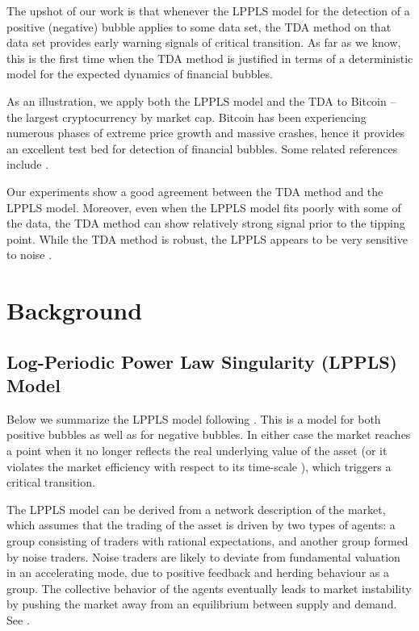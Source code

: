 \documentclass[11pt]{amsart}
\theoremstyle{definition}
\theoremstyle{remark}
\numberwithin{equation}{section}
\begin{document}
The upshot of our work is that whenever the LPPLS model for the detection of a positive (negative) bubble
applies to some data set,  the TDA method  on that data set  provides early warning signals of critical transition.
As far as we know, this is the first time when the TDA method is justified in terms of a deterministic model for the expected dynamics of financial bubbles.

As an illustration, we apply both the LPPLS model and the TDA to Bitcoin -- the largest cryptocurrency by market cap. Bitcoin has been experiencing numerous  phases of extreme price growth and  massive crashes, hence it provides an excellent test bed  for detection of financial bubbles.
Some related references include \cite{gerlach2018dissection,akcora2018bitcoin,rivera2019topological,gidea2020topological,akcora2020bitcoinheist,shu2020real,9309855}.

Our experiments show a good agreement between the TDA method and the LPPLS model. Moreover, even when the LPPLS model fits poorly with some of the data,
the TDA method can show relatively strong signal prior to the tipping point. While the TDA method is robust, the LPPLS appears to be very sensitive to noise \cite{bree2013prediction}.


\section{Background}


\subsection{Log-Periodic Power Law Singularity (LPPLS) Model}
Below we summarize the  LPPLS model following \cite{johansen1996discrete,johansen2000crashes,yan2012detection,seyrich2016micro,sornette2017stock,gerlach2018dissection}.
This is a model for both positive
bubbles %
as well as for  negative bubbles. %
In either case the market reaches a point when it  no longer reflects the real underlying value of the asset (or it violates the market
efficiency with respect to its time-scale \cite{sohn2017bubbles}),
which triggers a critical transition.


The LPPLS model can be derived from a network  description of the market, which assumes that the trading of the asset is driven by two  types of agents:
a group consisting of traders with rational expectations, and another group formed
by noise traders. Noise traders are likely to deviate from fundamental valuation in an accelerating mode, due to positive feedback and herding behaviour as a
group.  The  collective behavior of the agents eventually leads to market instability by pushing the market away from an equilibrium between supply and demand.   See \cite{johansen2000crashes,suchecki2005log,seyrich2016micro,sornette2017stock}.
\end{document}
